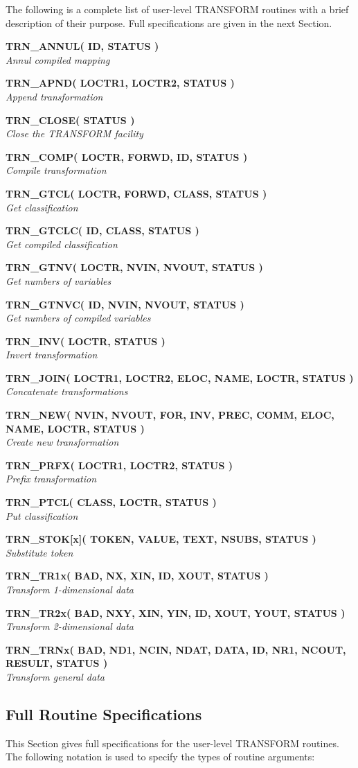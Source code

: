 \documentclass[twoside,11pt]{article}
\newcommand{\xlabel}[1]{}
\newcommand{\name}[1]{\mbox{\small{#1}}}
\newcommand{\noteroutine}[2]{\textbf{#1}\hspace*{\fill}\nopagebreak \\
                             \hspace*{3em}\emph{#2}\hspace*{\fill}\par}
\begin{document}
The following is a complete list of user-level \name{TRANSFORM} routines
with a brief description of their purpose.
Full specifications are given in the next Section.

\noteroutine{TRN\_ANNUL( ID, STATUS )}
            { Annul compiled mapping}
\noteroutine{TRN\_APND( LOCTR1, LOCTR2, STATUS )}
            { Append transformation}
\noteroutine{TRN\_CLOSE( STATUS )}
            { Close the \name{TRANSFORM} facility}
\noteroutine{TRN\_COMP( LOCTR, FORWD, ID, STATUS )}
            { Compile transformation}
\noteroutine{TRN\_GTCL( LOCTR, FORWD, CLASS, STATUS )}
            { Get classification}
\noteroutine{TRN\_GTCLC( ID, CLASS, STATUS )}
            { Get compiled classification}
\noteroutine{TRN\_GTNV( LOCTR, NVIN, NVOUT, STATUS )}
            { Get numbers of variables}
\noteroutine{TRN\_GTNVC( ID, NVIN, NVOUT, STATUS )}
            { Get numbers of compiled variables}
\noteroutine{TRN\_INV( LOCTR, STATUS )}
            { Invert transformation}
\noteroutine{TRN\_JOIN( LOCTR1, LOCTR2, ELOC, NAME, LOCTR, STATUS )}
            { Concatenate transformations}
\noteroutine{TRN\_NEW( NVIN, NVOUT, FOR, INV, PREC, COMM, ELOC, NAME, LOCTR, STATUS )}
            { Create new transformation}
\noteroutine{TRN\_PRFX( LOCTR1, LOCTR2, STATUS )}
            { Prefix transformation}
\noteroutine{TRN\_PTCL( CLASS, LOCTR, STATUS )}
            { Put classification}
\noteroutine{TRN\_STOK[x]( TOKEN, VALUE, TEXT, NSUBS, STATUS )}
            { Substitute token}
\noteroutine{TRN\_TR1x( BAD, NX, XIN, ID, XOUT, STATUS )}
            { Transform 1-dimensional data}
\noteroutine{TRN\_TR2x( BAD, NXY, XIN, YIN, ID, XOUT, YOUT, STATUS )}
            { Transform 2-dimensional data}
\noteroutine{TRN\_TRNx( BAD, ND1, NCIN, NDAT, DATA, ID, NR1, NCOUT, RESULT, STATUS )}
            { Transform general data}

\newpage
\subsection{\xlabel{full_routine_specifications}Full Routine Specifications}

This Section gives full specifications for the user-level \name{TRANSFORM}
routines.
The following notation is used to specify the types of routine arguments:
\end{document}

